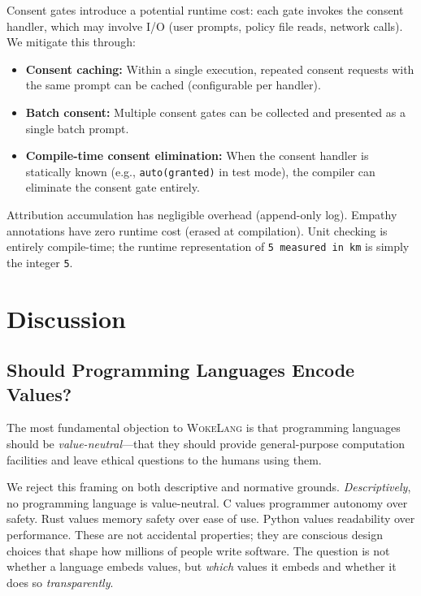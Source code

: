 \documentclass[11pt,a4paper]{article}
\newcommand{\WokeLang}{\textsc{WokeLang}}
\begin{document}
Consent gates introduce a potential runtime cost: each gate invokes
the consent handler, which may involve I/O (user prompts, policy file
reads, network calls).  We mitigate this through:

\begin{itemize}[leftmargin=*]
  \item \textbf{Consent caching:} Within a single execution, repeated
    consent requests with the same prompt can be cached (configurable
    per handler).
  \item \textbf{Batch consent:} Multiple consent gates can be
    collected and presented as a single batch prompt.
  \item \textbf{Compile-time consent elimination:} When the consent
    handler is statically known (e.g., \texttt{auto(granted)} in test
    mode), the compiler can eliminate the consent gate entirely.
\end{itemize}

Attribution accumulation has negligible overhead (append-only log).
Empathy annotations have zero runtime cost (erased at compilation).
Unit checking is entirely compile-time; the runtime representation of
\texttt{5 measured in km} is simply the integer \texttt{5}.

\section{Discussion}
\label{sec:discussion}

\subsection{Should Programming Languages Encode Values?}

The most fundamental objection to \WokeLang{} is that programming
languages should be \emph{value-neutral}---that they should provide
general-purpose computation facilities and leave ethical questions to
the humans using them.

We reject this framing on both descriptive and normative grounds.
\emph{Descriptively}, no programming language is value-neutral.  C
values programmer autonomy over safety.  Rust values memory safety
over ease of use.  Python values readability over performance.  These
are not accidental properties; they are conscious design
choices that shape how millions of people write software.  The
question is not whether a language embeds values, but \emph{which}
values it embeds and whether it does so \emph{transparently}.
\end{document}
